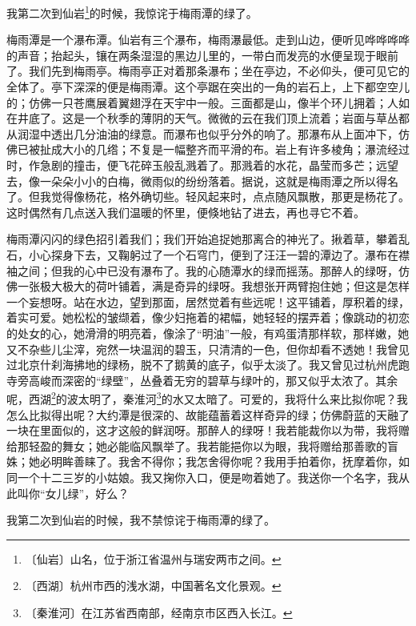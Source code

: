 \documentclass[12pt,UTF-8,openany]{ctexbook}
\begin{document}
\begin{large}
    
    我第二次到仙岩\footnote{〔仙岩〕山名，位于浙江省温州与瑞安两市之间。}的时候，我惊诧于梅雨潭的绿了。
    
    梅雨潭是一个瀑布潭。仙岩有三个瀑布，梅雨瀑最低。走到山边，便听见哗哗哗哗的声音；抬起头，镶在两条湿湿的黑边儿里的，一带白而发亮的水便呈现于眼前了。我们先到梅雨亭。梅雨亭正对着那条瀑布；坐在亭边，不必仰头，便可见它的全体了。亭下深深的便是梅雨潭。这个亭踞在突出的一角的岩石上，上下都空空儿的；仿佛一只苍鹰展着翼翅浮在天宇中一般。三面都是山，像半个环儿拥着；人如在井底了。这是一个秋季的薄阴的天气。微微的云在我们顶上流着；岩面与草丛都从润湿中透出几分油油的绿意。而瀑布也似乎分外的响了。那瀑布从上面冲下，仿佛已被扯成大小的几绺；不复是一幅整齐而平滑的布。岩上有许多棱角；瀑流经过时，作急剧的撞击，便飞花碎玉般乱溅着了。那溅着的水花，晶莹而多芒；远望去，像一朵朵小小的白梅，微雨似的纷纷落着。据说，这就是梅雨潭之所以得名了。但我觉得像杨花，格外确切些。轻风起来时，点点随风飘散，那更是杨花了。这时偶然有几点送入我们温暖的怀里，便倏地钻了进去，再也寻它不着。
    
    梅雨潭闪闪的绿色招引着我们；我们开始追捉她那离合的神光了。揪着草，攀着乱石，小心探身下去，又鞠躬过了一个石穹门，便到了汪汪一碧的潭边了。瀑布在襟袖之间；但我的心中已没有瀑布了。我的心随潭水的绿而摇荡。那醉人的绿呀，仿佛一张极大极大的荷叶铺着，满是奇异的绿呀。我想张开两臂抱住她；但这是怎样一个妄想呀。站在水边，望到那面，居然觉着有些远呢！这平铺着，厚积着的绿，着实可爱。她松松的皱缬着，像少妇拖着的裙幅，她轻轻的摆弄着；像跳动的初恋的处女的心，她滑滑的明亮着，像涂了“明油”一般，有鸡蛋清那样软，那样嫩，她又不杂些儿尘滓，宛然一块温润的碧玉，只清清的一色，但你却看不透她！我曾见过北京什刹海拂地的绿杨，脱不了鹅黄的底子，似乎太淡了。我又曾见过杭州虎跑寺旁高峻而深密的“绿壁”，丛叠着无穷的碧草与绿叶的，那又似乎太浓了。其余呢，西湖\footnote{〔西湖〕杭州市西的浅水湖，中国著名文化景观。}的波太明了，秦淮河\footnote{〔秦淮河〕在江苏省西南部，经南京市区西入长江。}的水又太暗了。可爱的，我将什么来比拟你呢？我怎么比拟得出呢？大约潭是很深的、故能蕴蓄着这样奇异的绿；仿佛蔚蓝的天融了一块在里面似的，这才这般的鲜润呀。那醉人的绿呀！我若能裁你以为带，我将赠给那轻盈的舞女；她必能临风飘举了。我若能挹你以为眼，我将赠给那善歌的盲姝；她必明眸善睐了。我舍不得你；我怎舍得你呢？我用手拍着你，抚摩着你，如同一个十二三岁的小姑娘。我又掬你入口，便是吻着她了。我送你一个名字，我从此叫你“女儿绿”，好么？
    
    我第二次到仙岩的时候，我不禁惊诧于梅雨潭的绿了。
    
\end{large}
\end{document}
